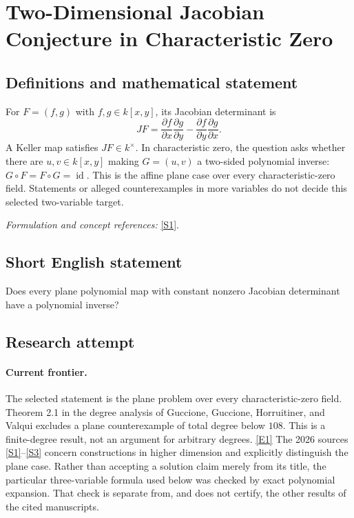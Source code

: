 \documentclass[11pt]{article}
\newcommand{\sref}[2]{\hyperlink{source:#1:#2}{[S#2]}}
\newcommand{\eref}[2]{\hyperlink{extra:#1:#2}{[E#2]}}
\newif\ifshowcatalogue
\newcommand{\cataloguescope}[1]{\ifshowcatalogue
 \paragraph{Exact scope in the supplied catalogue.}
 \begin{quote}\small #1\end{quote}\fi}
\begin{document}
\setcounter{section}{0}
\clearpage
\section*{\texorpdfstring{Two-Dimensional Jacobian Conjecture in Characteristic Zero}{Two-Dimensional Jacobian Conjecture in Characteristic Zero}}\label{statement}
\subsection{Definitions and mathematical statement}
For $F=(f,g)$ with $f,g\in k[x,y]$, its Jacobian determinant is
\[
 JF=\frac{\partial f}{\partial x}\frac{\partial g}{\partial y}
       -\frac{\partial f}{\partial y}\frac{\partial g}{\partial x}.
\]
A Keller map satisfies $JF\in k^\times$. In characteristic zero, the question asks whether there are $u,v\in k[x,y]$ making $G=(u,v)$ a two-sided polynomial inverse: $G\circ F=F\circ G=\operatorname{id}$. This is the affine plane case over every characteristic-zero field. Statements or alleged counterexamples in more variables do not decide this selected two-variable target.
\par\smallskip\textit{Formulation and concept references:} \sref{statement}{1}.
\cataloguescope{Let k be a field of characteristic zero and let F:k\textasciicircum{}2 -> k\textasciicircum{}2 be a polynomial map whose Jacobian determinant is a nonzero constant. Determine whether F must have a polynomial inverse, equivalently whether every two-variable Keller map is a polynomial automorphism of the affine plane.}
\subsection{Short English statement}
Does every plane polynomial map with constant nonzero Jacobian determinant have a polynomial inverse?
\subsection{Research attempt}

\paragraph{Current frontier.}
The selected statement is the plane problem over every characteristic-zero
field. Theorem 2.1 in the degree analysis of Guccione, Guccione, Horruitiner,
and Valqui excludes a plane counterexample of total degree below $108$.
This is a finite-degree result, not an argument for arbitrary degrees.
\eref{statement}{1}
The 2026 sources \sref{statement}{1}--\sref{statement}{3} concern constructions in
higher dimension and explicitly distinguish the plane case. Rather than
accepting a solution claim merely from its title, the particular
three-variable formula used below was checked by exact polynomial expansion.
That check is separate from, and does not certify, the other results of the
cited manuscripts.
\end{document}
